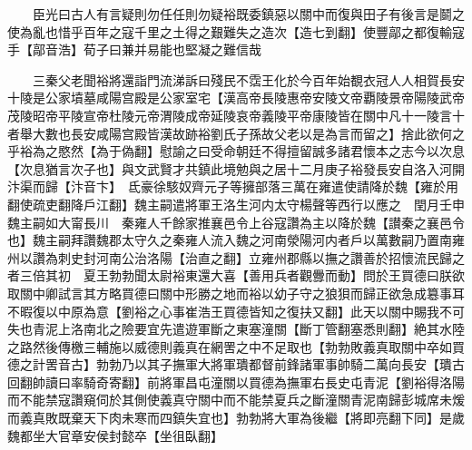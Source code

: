 　　臣光曰古人有言疑則勿任任則勿疑裕既委鎮惡以關中而復與田子有後言是鬬之使為亂也惜乎百年之寇千里之土得之艱難失之造次【造七到翻】使豐鄗之都復輸寇手【鄗音浩】荀子曰兼并易能也堅凝之難信哉

　　三秦父老聞裕將還詣門流涕訴曰殘民不霑王化於今百年始覩衣冠人人相賀長安十陵是公家墳墓咸陽宫殿是公家室宅【漢高帝長陵惠帝安陵文帝覇陵景帝陽陵武帝茂陵昭帝平陵宣帝杜陵元帝渭陵成帝延陵哀帝義陵平帝康陵皆在關中凡十一陵言十者舉大數也長安咸陽宫殿皆漢故跡裕劉氏子孫故父老以是為言而留之】捨此欲何之乎裕為之愍然【為于偽翻】慰諭之曰受命朝廷不得擅留誠多諸君懷本之志今以次息【次息猶言次子也】與文武賢才共鎮此境勉與之居十二月庚子裕發長安自洛入河開汴渠而歸【汴音卞】　氐豪徐駭奴齊元子等擁部落三萬在雍遣使請降於魏【雍於用翻使疏吏翻降戶江翻】魏主嗣遣將軍王洛生河内太守楊聲等西行以應之　閏月壬申魏主嗣如大甯長川　秦雍人千餘家推襄邑令上谷寇讚為主以降於魏【讃秦之襄邑令也】魏主嗣拜讚魏郡太守久之秦雍人流入魏之河南滎陽河内者戶以萬數嗣乃置南雍州以讚為刺史封河南公治洛陽【治直之翻】立雍州郡縣以撫之讚善於招懷流民歸之者三倍其初　夏王勃勃聞太尉裕東還大喜【善用兵者觀釁而動】問於王買德曰朕欲取關中卿試言其方略買德曰關中形勝之地而裕以幼子守之狼狽而歸正欲急成簒事耳不暇復以中原為意【劉裕之心事崔浩王買德皆知之復扶又翻】此天以關中賜我不可失也青泥上洛南北之險要宜先遣遊軍斷之東塞潼關【斷丁管翻塞悉則翻】絶其水陸之路然後傳檄三輔施以威德則義真在網罟之中不足取也【勃勃敗義真取關中卒如買德之計罟音古】勃勃乃以其子撫軍大將軍璝都督前鋒諸軍事帥騎二萬向長安【璝古回翻帥讀曰率騎奇寄翻】前將軍昌屯潼關以買德為撫軍右長史屯青泥【劉裕得洛陽而不能禁寇讚窺伺於其側使義真守關中而不能禁夏兵之斷潼關青泥南歸彭城席未煖而義真敗既棄天下肉未寒而四鎮失宜也】勃勃將大軍為後繼【將即亮翻下同】是歲魏都坐大官章安侯封懿卒【坐徂臥翻】

